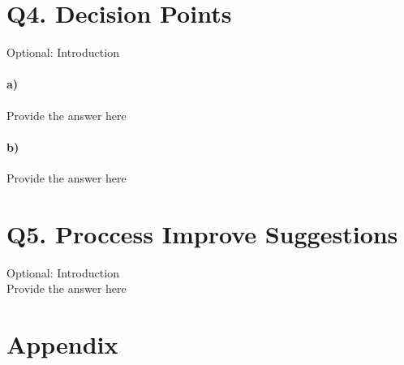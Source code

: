 \documentclass[12pt]{report}
\begin{document}
\section{Q4. Decision Points}
\textlangle Optional: Introduction \textrangle
\paragraph{a)} \textlangle Provide the answer here\textrangle
\paragraph{b)} \textlangle Provide the answer here\textrangle

\section{Q5. Proccess Improve Suggestions}
\textlangle Optional: Introduction \textrangle \\
\textlangle Provide the answer here\textrangle

\newpage
\section{Appendix}
\end{document}
